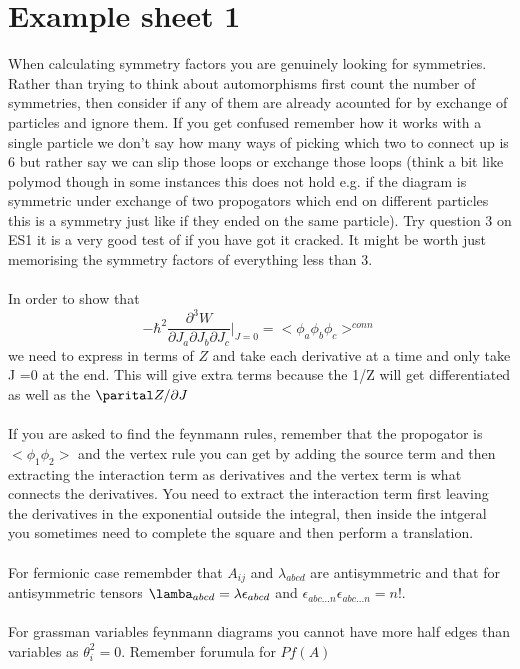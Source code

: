 \documentclass{article}
\begin{document}
\section{Example sheet 1}
When calculating symmetry factors you are genuinely looking for symmetries. Rather than trying to think about automorphisms first count the number of symmetries, then consider if any of them are already acounted for by exchange of particles and ignore them. If you get confused remember how it works with a single particle we don't say how many ways of picking which two to connect up is 6 but rather say we can slip those loops or exchange those loops (think a bit like polymod though in some instances this does not hold e.g. if the diagram is symmetric under exchange of two propogators which end on different particles this is a symmetry just like if they ended on the same particle). Try question 3 on ES1 it is a very good test of if you have got it cracked. It might be worth just memorising the symmetry factors of everything less than 3.\\\\
In order to show that 
$$
- \hbar^2 \frac{\partial^3 W}{\partial J_a \partial J_b \partial J_c}|_{J=0} = < \phi_a\phi_b \phi_c> ^{conn}
$$
we need to express in terms of $Z$ and take each derivative at a time and only take J =0 at the end. This will give extra terms because the 1/Z will get differentiated as well as the $\parital Z/ \partial J$\\\\
If you are asked to find the feynmann rules, remember that the propogator is $<\phi_1 \phi_2>$ and the vertex rule you can get by adding the source term and then extracting the interaction term as derivatives and the vertex term is what connects the derivatives. You need to extract the interaction term first leaving the derivatives in the exponential outside the integral, then inside the intgeral you sometimes need to complete the square and then perform a translation.\\\\
For fermionic case remembder that $A_{ij}$ and $\lambda_{abcd}$ are antisymmetric and that for antisymmetric tensors $\lamba_{abcd} =\lambda \epsilon_{abcd}$ and $\epsilon_{abc...n}\epsilon_{abc...n} = n!$.\\\\
For grassman variables feynmann diagrams you cannot have more half edges than variables as $\theta_i^2 = 0$. Remember forumula for $Pf(A)$
\end{document}
